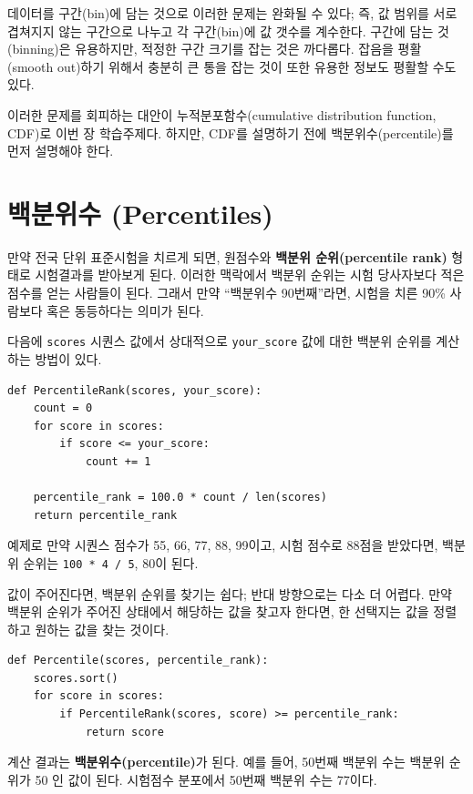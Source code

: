데이터를 구간(bin)에 담는 것으로 이러한 문제는 완화될 수 있다; 즉, 값 범위를 서로 겹쳐지지 않는 구간으로 
나누고 각 구간(bin)에 값 갯수를 계수한다. 구간에 담는 것(binning)은 유용하지만,
적정한 구간 크기를 잡는 것은 까다롭다. 잡음을 평활(smooth out)하기 위해서 충분히 큰 통을 잡는 것이 
또한 유용한 정보도 평활할 수도 있다.

이러한 문제를 회피하는 대안이 누적분포함수(cumulative
distribution function, CDF)로 이번 장 학습주제다. 하지만, CDF를 설명하기 전에 백분위수(percentile)를 먼저 설명해야 한다.


\section{백분위수 (Percentiles)}

만약 전국 단위 표준시험을 치르게 되면, 원점수와 {\bf 백분위 순위(percentile rank)} 형태로 시험결과를 받아보게 된다. 이러한 맥락에서 백분위 순위는 시험 당사자보다 적은 점수를 얻는 사람들이 된다.
그래서 만약 ``백분위수 90번째''라면, 시험을 치른 90\% 사람보다 혹은 동등하다는 의미가 된다.

다음에 {\tt scores} 시퀀스 값에서 상대적으로 \verb"your_score" 값에 대한 백분위 순위를 계산하는 방법이 있다.

%
\begin{verbatim}
def PercentileRank(scores, your_score):
    count = 0
    for score in scores:
        if score <= your_score:
            count += 1

    percentile_rank = 100.0 * count / len(scores)
    return percentile_rank
\end{verbatim}

예제로 만약 시퀀스 점수가 55, 66, 77, 88, 99이고, 시험 점수로 88점을 받았다면, 
백분위 순위는 {\tt 100 * 4 / 5}, 80이 된다.

값이 주어진다면, 백분위 순위를 찾기는 쉽다; 반대 방향으로는 다소 더 어렵다.
만약 백분위 순위가 주어진 상태에서 해당하는 값을 찾고자 한다면, 한 선택지는 값을 정렬하고
원하는 값을 찾는 것이다.

%
\begin{verbatim}
def Percentile(scores, percentile_rank):
    scores.sort()
    for score in scores:
        if PercentileRank(scores, score) >= percentile_rank:
            return score
\end{verbatim}

계산 결과는 {\bf 백분위수(percentile)}가 된다. 
예를 들어, 50번째 백분위 수는 백분위 순위가 50 인 값이 된다. 
시험점수 분포에서 50번째 백분위 수는 77이다.

